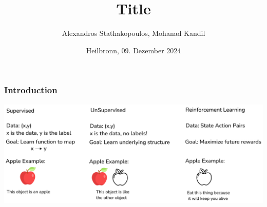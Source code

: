 %
% 
% 
%





\renewcommand{\PersonTitel}{}
\newcommand{\Datum}{\today}

\renewcommand{\PraesentationFusszeileZusatz}{}

\title{Title}
\author{Alexandros Stathakopoulos, Mohanad Kandil}
\institute[]{\UniversitaetName}
\date[\Datum]{Heilbronn, 09. Dezember 2024}
\subject{}



\graphicspath{ {Ressourcen/_Bilder/} }
\PraesentationMasterStandard

\PraesentationTitelseite %

\begin{frame}
	\frametitle{Introduction}
	\vspace{1cm}
	\centering
	\includegraphics[scale=0.1]{appleNYC}
\end{frame}

